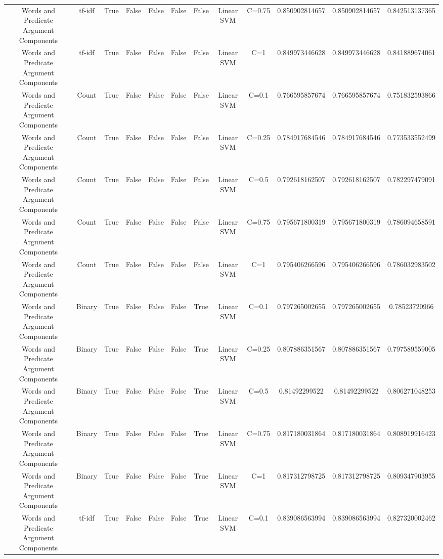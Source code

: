 \documentclass[11pt]{article}
\begin{document}
\begin{tabular}{|c|c|c|c|c|c|c|c|c|c|c|c|}
Words and Predicate Argument Components & tf-idf & True & False & False & False & False & Linear SVM & C=0.75 & 0.850902814657 & 0.850902814657 & 0.842513137365 \\ 
Words and Predicate Argument Components & tf-idf & True & False & False & False & False & Linear SVM & C=1 & 0.849973446628 & 0.849973446628 & 0.841889674061 \\ 
Words and Predicate Argument Components & Count & True & False & False & False & False & Linear SVM & C=0.1 & 0.766595857674 & 0.766595857674 & 0.751832593866 \\ 
Words and Predicate Argument Components & Count & True & False & False & False & False & Linear SVM & C=0.25 & 0.784917684546 & 0.784917684546 & 0.773533552499 \\ 
Words and Predicate Argument Components & Count & True & False & False & False & False & Linear SVM & C=0.5 & 0.792618162507 & 0.792618162507 & 0.782297479091 \\ 
Words and Predicate Argument Components & Count & True & False & False & False & False & Linear SVM & C=0.75 & 0.795671800319 & 0.795671800319 & 0.786094658591 \\ 
Words and Predicate Argument Components & Count & True & False & False & False & False & Linear SVM & C=1 & 0.795406266596 & 0.795406266596 & 0.786032983502 \\ 
Words and Predicate Argument Components & Binary & True & False & False & False & True & Linear SVM & C=0.1 & 0.797265002655 & 0.797265002655 & 0.78523720966 \\ 
Words and Predicate Argument Components & Binary & True & False & False & False & True & Linear SVM & C=0.25 & 0.807886351567 & 0.807886351567 & 0.797589559005 \\ 
Words and Predicate Argument Components & Binary & True & False & False & False & True & Linear SVM & C=0.5 & 0.81492299522 & 0.81492299522 & 0.806271048253 \\ 
Words and Predicate Argument Components & Binary & True & False & False & False & True & Linear SVM & C=0.75 & 0.817180031864 & 0.817180031864 & 0.808919916423 \\ 
Words and Predicate Argument Components & Binary & True & False & False & False & True & Linear SVM & C=1 & 0.817312798725 & 0.817312798725 & 0.809347903955 \\ 
Words and Predicate Argument Components & tf-idf & True & False & False & False & True & Linear SVM & C=0.1 & 0.839086563994 & 0.839086563994 & 0.827320002462 \\ 

\end{tabular}
\end{document}
